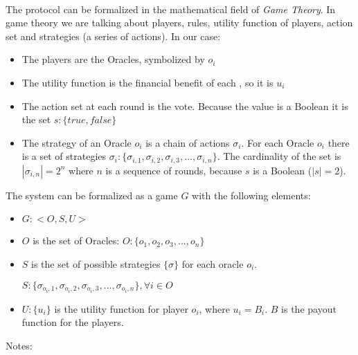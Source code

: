 \documentclass{article}
\begin{document}
\paragraph{ }
The protocol can be formalized in the mathematical field of \emph{Game Theory}. In game theory we are talking about players, rules, utility function of players, action set and  strategies (a series of actions). In our case:
\begin{itemize}
\item The players are the Oracles, symbolized by $o_i$
\item The utility function is the financial benefit of each , so it is $u_i$
\item The action set at each round is the vote. Because the value is a Boolean it is the set $s : \{true,false\}$
\item The strategy of an Oracle $o_i$ is a chain of actions $\sigma_i$. For each Oracle $o_i$ there is a set of strategies $\sigma_{i}: \{\sigma_{i,1},\sigma_{i,2},\sigma_{i,3},...,\sigma_{i,n}\}$. The cardinality of the set is $|\sigma_{i,n}|=2^n$ where $n$ is a sequence of rounds, because $s$ is a Boolean ($|s|=2$).
\end{itemize}
The system can be formalized as a game $G$ with the following elements:
\begin{itemize}
\item $G:<O, S, U>$
\item $O$ is the set of Oracles: $O:\{o_1,o_2,o_3,...,o_n\}$
\item $S$ is the set of possible strategies $\{\sigma\}$ for each oracle $o_i$. 
\par$S:\{\sigma_{o_i,1},\sigma_{o_i,2},\sigma_{o_i,3},...,\sigma_{o_i,n}\} , \forall i \in O$
\item $U: \{u_i\}$ is the utility function for player $o_i$, where $u_i=B_i$. $B$ is the payout function for the players.
\end{itemize}
Notes:
\end{document}
